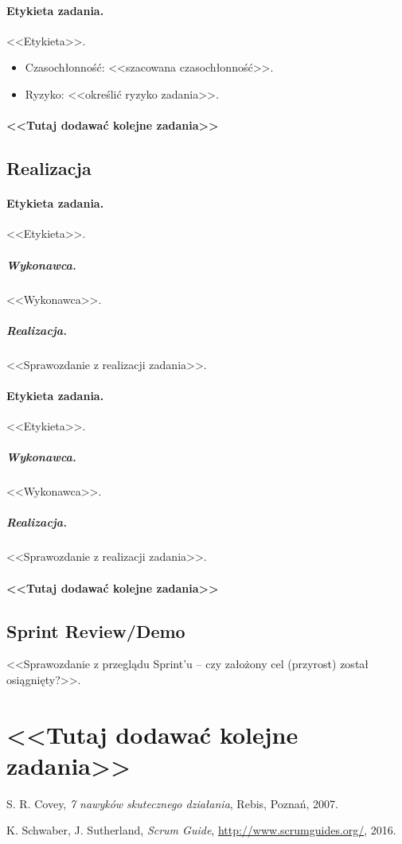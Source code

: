 \documentclass[a4paper]{article}
\begin{document}
\paragraph{Etykieta zadania.} <<Etykieta>>.
\begin{itemize}
\item Czasochłonność: <<szacowana czasochłonność>>.
\item{Ryzyko:} <<określić ryzyko zadania>>.
\end{itemize}

\paragraph{<<Tutaj dodawać kolejne zadania>>}

\subsection{Realizacja}

\paragraph{Etykieta zadania.} <<Etykieta>>.
\subparagraph{Wykonawca.} <<Wykonawca>>.
\subparagraph{Realizacja.} <<Sprawozdanie z realizacji zadania>>.

\paragraph{Etykieta zadania.} <<Etykieta>>.
\subparagraph{Wykonawca.} <<Wykonawca>>.
\subparagraph{Realizacja.} <<Sprawozdanie z realizacji zadania>>.

\paragraph{<<Tutaj dodawać kolejne zadania>>}


\subsection{Sprint Review/Demo}
<<Sprawozdanie z przeglądu Sprint'u -- czy założony cel (przyrost) został osiągnięty?>>.

\section*{<<Tutaj dodawać kolejne zadania>>}

\begin{thebibliography}{9}

 S. R. Covey, {\em 7 nawyków skutecznego działania}, Rebis, Poznań, 2007.

 K. Schwaber, J. Sutherland, {\em Scrum Guide}, \url{http://www.scrumguides.org/}, 2016.

\end{thebibliography}
\end{document}
